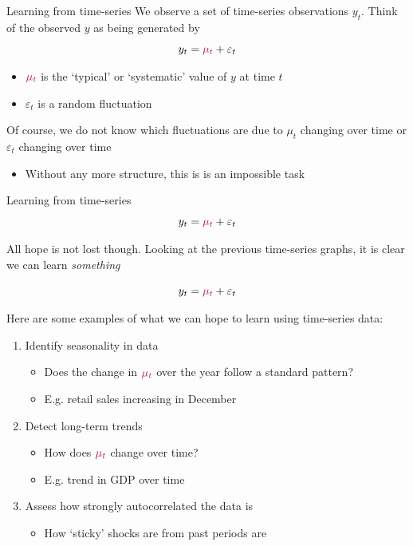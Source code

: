 \documentclass[aspectratio=169,t,11pt,table]{beamer}
\begin{document}
\begin{frame}{Learning from time-series}
  We observe a set of time-series observations $y_t$. Think of the observed $y$ as being generated by 
  $$
    y_t = {\color[HTML]{B3114B} \mu_t} + \varepsilon_t
  $$
  \begin{itemize}
    \item ${\color[HTML]{B3114B} \mu_t}$ is the `typical' or `systematic' value of $y$ at time $t$
    
    \item $\varepsilon_t$ is a random fluctuation
  \end{itemize}

  \bigskip
  Of course, we do not know which fluctuations are due to $\mu_t$ changing over time or $\varepsilon_t$ changing over time
  \begin{itemize}
    \item Without any more structure, this is is an impossible task
  \end{itemize}
\end{frame}

\begin{frame}{Learning from time-series}
  \vspace*{-\bigskipamount}
  $$
    y_t = {\color[HTML]{B3114B} \mu_t} + \varepsilon_t
  $$

  \bigskip
  All hope is not lost though. Looking at the previous time-series graphs, it is clear we can learn \emph{something}
\end{frame}

\begin{frame}{}
  $$
    y_t = {\color[HTML]{B3114B} \mu_t} + \varepsilon_t
  $$
  
  Here are some examples of what we can hope to learn using time-series data:
  \begin{enumerate}
    \item Identify \alert{seasonality} in data 
    \begin{itemize}
      \item Does the change in ${\color[HTML]{B3114B} \mu_t}$ over the year follow a standard pattern?
      \item E.g. retail sales increasing in December
    \end{itemize}
    
    \item Detect long-term \alert{trends} 
    \begin{itemize}
      \item How does ${\color[HTML]{B3114B} \mu_t}$ change over time? 
      \item E.g. trend in GDP over time
    \end{itemize}
    
    \item Assess how \alert{strongly autocorrelated} the data is 
    \begin{itemize}
      \item How `sticky' shocks are from past periods are
    \end{itemize}
  \end{enumerate}
\end{frame}
\end{document}
